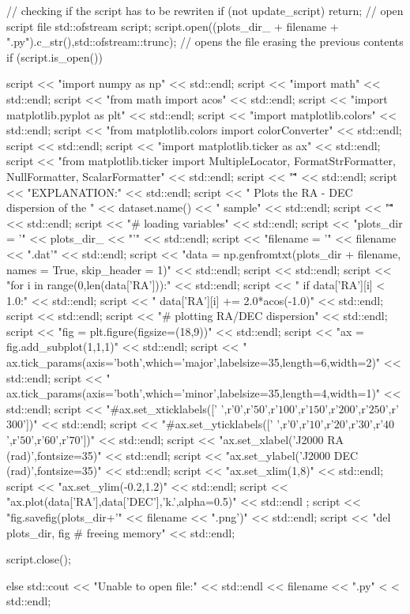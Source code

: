 \begin{DoxyCode}
{    // checking if the script has to be rewriten
    if (not update_script){
        return;
    }
    // open script file
    std::ofstream script;
    script.open((plots_dir_ + filename + ".py").c_str(),std::ofstream::trunc); 
      // opens the file erasing the previous contents
    if (script.is_open()){
        script << "import numpy as np" << std::endl;
        script << "import math" << std::endl;
        script << "from math import acos" << std::endl;
        script << "import matplotlib.pyplot as plt" << std::endl;
        script << "import matplotlib.colors" << std::endl;
        script << "from matplotlib.colors import colorConverter" << std::endl;
        script << std::endl;
        script << "import matplotlib.ticker as ax" << std::endl;
        script << "from matplotlib.ticker import MultipleLocator,
       FormatStrFormatter, NullFormatter, ScalarFormatter" << std::endl;
        script << "\"\"\"" << std::endl;
        script << "EXPLANATION:" << std::endl;
        script << "    Plots the RA - DEC dispersion of the " << dataset.name()
       << " sample" << std::endl;
        script << "\"\"\"" << std::endl;
        script << "# loading variables" << std::endl;
        script << "plots_dir = '" << plots_dir_ << "'" << std::endl;
        script << "filename = '" << filename << ".dat'" << std::endl;
        script << "data = np.genfromtxt(plots_dir + filename, names = True,
       skip_header = 1)" << std::endl;
        script << std::endl;
        script << "for i in range(0,len(data['RA'])):" << std::endl;
        script << "    if data['RA'][i] < 1.0:" << std::endl;
        script << "        data['RA'][i] += 2.0*acos(-1.0)" << std::endl;
        script << std::endl;
        script << "# plotting RA/DEC dispersion" << std::endl;
        script << "fig = plt.figure(figsize=(18,9))" << std::endl;
        script << "ax = fig.add_subplot(1,1,1)" << std::endl;
        script << "
      ax.tick_params(axis='both',which='major',labelsize=35,length=6,width=2)" << std::endl;
        script << "
      ax.tick_params(axis='both',which='minor',labelsize=35,length=4,width=1)" << std::endl;
        script << "#ax.set_xticklabels(['
       ',r'$0$',r'$50$',r'$100$',r'$150$',r'$200$',r'$250$',r'$300$'])" << std::endl;
        script << "#ax.set_yticklabels(['
       ',r'$0$',r'$10$',r'$20$',r'$30$',r'$40$',r'$50$',r'$60$',r'$70$'])" << std::endl;
        script << "ax.set_xlabel('J2000 RA (rad)',fontsize=35)" << std::endl;
        script << "ax.set_ylabel('J2000 DEC (rad)',fontsize=35)" << std::endl;
        script << "ax.set_xlim(1,8)" << std::endl;
        script << "ax.set_ylim(-0.2,1.2)" << std::endl;
        script << "ax.plot(data['RA'],data['DEC'],'k.',alpha=0.5)" << std::endl
      ;
        script << "fig.savefig(plots_dir+'" << filename << ".png')" << 
      std::endl;
        script << "del plots_dir, fig # freeing memory" << std::endl;
        
        
        script.close();
    }
    else{
        std::cout << "Unable to open file:" << std::endl << filename << ".py" <
      < std::endl;
    }
}
\end{DoxyCode}
